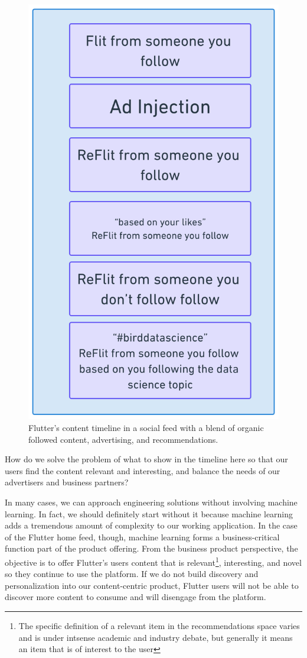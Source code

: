\documentclass[11pt, table]{diazessay} %
\begin{document}
\begin{sloppypar}
\begin{figure}[H]
\centering
\includegraphics[width=.5\textwidth]{figures/timeline.png}
\caption{Flutter's content timeline in a social feed with a blend of organic followed content, advertising, and recommendations.}
\end{figure}

How do we solve the problem of what to show in the timeline here so that our users find the content relevant and interesting, and balance the needs of our advertisers and business partners? 

In many cases, we can approach engineering solutions without involving machine learning. In fact, we should definitely start without it\citep{zinkevich2017rules} because machine learning adds a tremendous amount of complexity to our working application\citep{sculley2014machine}. In the case of the Flutter home feed, though, machine learning forms a business-critical function part of the product offering. From the business product perspective, the objective is to offer Flutter’s users content that is relevant\footnote{The specific definition of a relevant item in the recommendations space varies and is under intsense academic and industry debate, but generally it means an item that is of interest to the user}, interesting, and novel so they continue to use the platform.  If we do not build discovery and personalization into our content-centric product, Flutter users will not be able to discover more content to consume and will disengage from the platform. 


\end{sloppypar}
\end{document}
